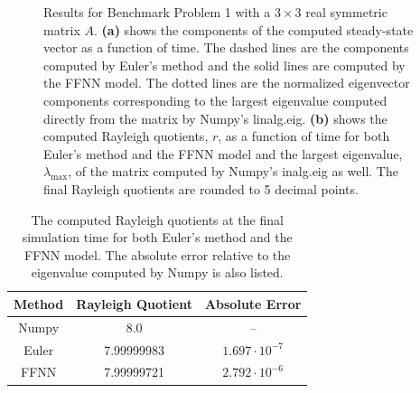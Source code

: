 \begin{figure}[H]
\centering
{}
\qquad
{}
\caption{Results for Benchmark Problem 1 with a $3\times 3$ real symmetric matrix $A$. \textbf{(a)} shows the components of the computed steady-state vector as a function of time. The dashed lines are the components computed by Euler's method and the solid lines are computed by the FFNN model. The dotted lines are the normalized eigenvector components corresponding to the largest eigenvalue computed directly from the matrix by Numpy's linalg.eig. \textbf{(b)} shows the computed Rayleigh quotients, $r$, as a function of time for both Euler's method and the FFNN model and the largest eigenvalue, $\lambda_\mathrm{max}$, of the matrix computed by Numpy's inalg.eig as well. The final Rayleigh quotients are rounded to 5 decimal points.}
\label{fig:benchrun1}
\end{figure}

\begin{table}[H]
\caption{The computed Rayleigh quotients at the final simulation time for both Euler's method and the FFNN model. The absolute error relative to the eigenvalue computed by Numpy is also listed.}
\centering
{}
\begin{tabular}{c|c|c}
\hline
\hline 
Method & Rayleigh Quotient & Absolute Error
\\
\hline 
\hline 
Numpy & 8.0 & –
\\
Euler & 7.99999983 & $1.697 \cdot 10^{-7}$  
\\
FFNN & 7.99999721 & $2.792 \cdot 10^{-6}$
\\
\hline
\hline 
\end{tabular}
\label{tab:eigbench1}
\end{table}

